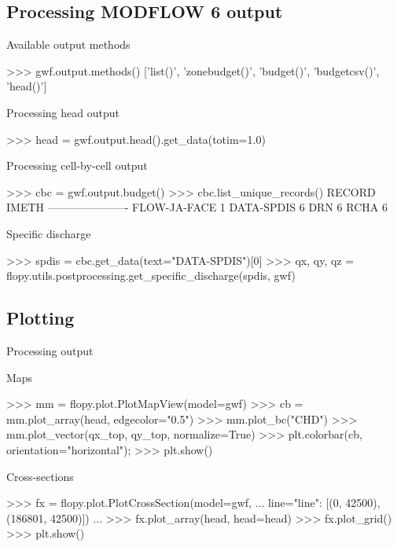 \documentclass[11pt, oneside]{article}   	%
\begin{document}


\subsection{Processing MODFLOW 6 output}

Available output methods 


\begin{python}
>>> gwf.output.methods()
['list()', 'zonebudget()', 'budget()', 'budgetcsv()', 'head()']
\end{python}

Processing head output 

\begin{python}
>>> head = gwf.output.head().get_data(totim=1.0)
\end{python}

Processing cell-by-cell output 

\begin{python}
>>> cbc = gwf.output.budget()
>>> cbc.list_unique_records()
RECORD           IMETH
----------------------
FLOW-JA-FACE         1
DATA-SPDIS           6
DRN                  6
RCHA                 6
\end{python}

Specific discharge

\begin{python}
>>> spdis = cbc.get_data(text="DATA-SPDIS")[0]
>>> qx, qy, qz = flopy.utils.postprocessing.get_specific_discharge(spdis, gwf)
\end{python}

\subsection{Plotting}

Processing output

Maps

\begin{python}
>>> mm = flopy.plot.PlotMapView(model=gwf)
>>> cb = mm.plot_array(head, edgecolor="0.5")
>>> mm.plot_bc("CHD")
>>> mm.plot_vector(qx_top, qy_top, normalize=True)
>>> plt.colorbar(cb, orientation="horizontal");
>>> plt.show()
\end{python}

Cross-sections 

\begin{python}
>>> fx = flopy.plot.PlotCrossSection(model=gwf, 
... line={"line": [(0, 42500), (186801, 42500)]})
...
>>> fx.plot_array(head, head=head)
>>> fx.plot_grid()
>>> plt.show()
\end{python}
\end{document}
